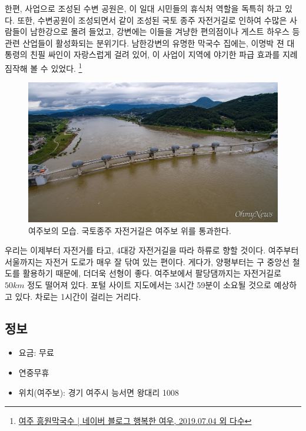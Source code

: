 \documentclass[chapter, oneside]{oblivoir}
\begin{document}
한편, 사업으로 조성된 수변 공원은, 이 일대 시민들의 휴식처 역할을 독특히 하고 있다.
또한, 수변공원이 조성되면서 같이 조성된 국토 종주 자전거길로 인하여 수많은 사람들이 남한강으로 몰려 들었고,
강변에는 이들을 겨냥한 편의점이나 게스트 하우스 등 관련 산업들이 활성화되는 분위기다.
남한강변의 유명한 막국수 집에는, 이명박 젼 대통령의 친필 싸인이 자랑스럽게 걸려 있어,
이 사업이 지역에 야기한 파급 효과를 지례 짐작해 볼 수 있었다.
\footnote{\href{https://blog.naver.com/lovelyiii/221577715597}{여주 흥원막국수 | 네이버 블로그 행복한 여우, 2019.07.04 외 다수}}

\begin{figure}
    \centering
    \includegraphics[width=.8\textwidth]{img/여주보.jpg}
    \caption{여주보의 모습. 국토종주 자전거길은 여주보 위를 통과한다. \protect\footnotemark}
    \label{fig:my_labe7}
\end{figure}


우리는 이제부터 자전거를 타고, 4대강 자전거길을 따라 하류로 향할 것이다.
여주부터 서울까지는 자전거 도로가 매우 잘 닦여 있는 편이다.
게다가, 양평부터는 구 중앙선 철도를 활용하기 때문에, 더더욱 선형이 좋다.
여주보에서 팔당댐까지는 자전거길로 $50km$ 정도 떨어져 있다. 
포털 사이트 지도에서는 3시간 59분이 소요될 것으로 예상하고 있다.
차로는 1시간이 걸리는 거리다.

\subsection{정보}
\begin{itemize}
    \item 요금: 무료
    \item 연중무휴
    \item 위치(여주보): 경기 여주시 능서면 왕대리 1008 
\end{itemize}
\end{document}
